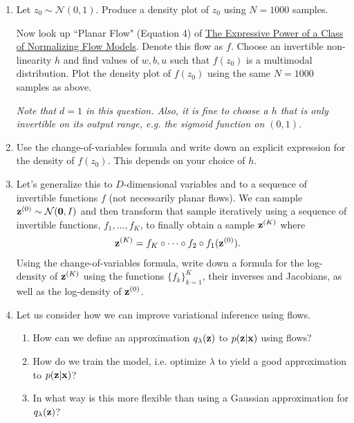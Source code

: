 \documentclass[11pt]{article}
\begin{document}
\begin{enumerate}[label=(\Alph*)]
    \item Let $z_0 \sim \mathcal{N}(0,1)$. Produce a density plot of $z_0$ using $N=1000$ samples.
    
    Now look up ``Planar Flow" (Equation 4) of \href{https://arxiv.org/pdf/2006.00392.pdf}{The Expressive Power of a Class of Normalizing Flow Models}. Denote this flow as $f$. Choose an invertible non-linearity $h$ and find values of $w,b,u$ such that $f(z_0)$ is a multimodal distribution. Plot the density plot of $f(z_0)$ using the same $N=1000$ samples as above.
    
    \textit{Note that $d=1$ in this question. Also, it is fine to choose a $h$ that is only invertible on its output range, e.g. the sigmoid function on $(0,1)$.}

    \item Use the change-of-variables formula and write down an explicit expression for the density of $f(z_0)$. This depends on your choice of $h$.


    \item Let's generalize this to $D$-dimensional variables and to a sequence of invertible functions $f$ (not necessarily planar flows). We can sample ${\mathbf z}^{(0)} \sim  \mathcal{N}(\mathbf{0}, I)$ and then transform that sample iteratively using a sequence of invertible functions, $f_1, \dots, f_K$, to finally obtain a sample ${\mathbf z}^{(K)}$ where
     \begin{align*}
        {\mathbf z}^{(K)} &= f_K \circ \dots \circ f_2 \circ f_1({\mathbf z}^{(0)}).
     \end{align*}
    Using the change-of-variables formula, write down a formula for the log-density of ${\mathbf z}^{(K)}$ using the functions $\{f_k\}^K_{k=1}$, their inverses and Jacobians, as well as the log-density of ${\mathbf z}^{(0)}$.


    \item Let us consider how we can improve variational inference using flows.
     \begin{enumerate}[label=(\roman*)]
        \item How can we define an approximation $q_\lambda({\mathbf z})$ to $p({\mathbf z}|{\mathbf x})$ using flows?
        \item How do we train the model, i.e. optimize $\lambda$ to yield a good approximation to $p({\mathbf z}|{\mathbf x})$?
        \item In what way is this more flexible than using a Gaussian approximation for $q_\lambda({\mathbf z})$?
     \end{enumerate}

\end{enumerate}
\end{document}

